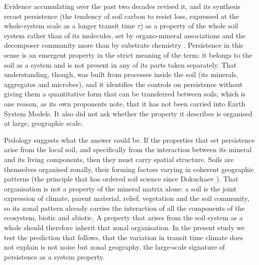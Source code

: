 \documentclass[12pt, a4paper]{article}
\begin{document}
Evidence accumulating over
the past two decades revised it, and its synthesis \citep{Schmidt2011} recast
persistence (the tendency of soil carbon to resist loss, expressed at the
whole-system scale as a longer transit time $\tau$) as a property of the whole soil
system rather than of its molecules, set
by organo-mineral associations and the decomposer community more than by substrate
chemistry \citep{Kleber2007,LehmannKleber2015}. Persistence in this sense is an
emergent property in the strict meaning of the term: it belongs to the soil as a
system and is not present in any of its parts taken separately. That understanding,
though, was built from processes inside the soil (its minerals, aggregates and
microbes), and it identifies the controls on persistence without giving them a
quantitative form that can be transferred between soils, which is one reason, as its
own proponents note, that it has not been carried into Earth System Models. It also
did not ask whether the property it describes is organised at large, geographic
scale.

Pedology suggests what the answer could be. If the properties that set persistence
arise from the local soil, and specifically from the interaction between its mineral
and its living components, then they must carry spatial structure. Soils are
themselves organised zonally, their forming factors varying in coherent geographic
patterns (the principle that has ordered soil science since Dokuchaev
\citep{Dokuchaev1883,Jenny1941}). That organisation is not a property of the mineral
matrix alone: a soil is the joint expression of climate, parent material, relief,
vegetation and the soil community, so its zonal pattern already carries the
interaction of all the components of the ecosystem, biotic and abiotic. A property
that arises from the soil system as a whole should therefore inherit that zonal
organisation. In the present study we test the prediction that follows, that the
variation in transit time climate does not explain is not noise but zonal geography,
the large-scale signature of persistence as a system property.
\end{document}
